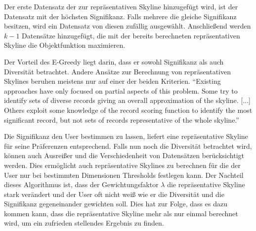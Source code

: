 Der erste Datensatz der zur repräsentativen Skyline hinzugefügt wird, ist der Datensatz mit der höchsten Signifikanz. Falls mehrere die gleiche Signifikanz besitzen, wird ein Datensatz von diesen zufällig ausgewählt.
Anschließend werden $k-1$ Datensätze hinzugefügt, die mit der bereits berechneten repräsentativen Skyline die Objektfunktion maximieren.

Der Vorteil des E-Greedy liegt darin, dass er sowohl Signifikanz als auch Diversität betrachtet. Andere Ansätze zur Berechnung von repräsentativen Skylines beruhen meistens nur auf einer der beiden Kriterien.  
\enquote{Existing approaches have only focused on partial aspects of this problem. Some try to identify sets of diverse records giving an overall approximation of the skyline. [...] Others exploit some knowledge of the record scoring function to identify the most significant record, but not sets of records representative of the whole skyline.} \cite[p. 1]{magnani2014taking}
 
Die Signifikanz den User bestimmen zu lassen, liefert eine repräsentative Skyline für seine Präferenzen entsprechend. Falls nun noch die Diversität betrachtet wird, können auch Ausreißer und die Verschiedenheit von Datensätzen berücksichtigt werden. Dies ermöglicht auch repräsentative Skylines zu berechnen für die der User nur bei bestimmten Dimensionen Thresholds festlegen kann.
Der Nachteil dieses Algorithmus ist, dass der Gewichtungsfaktor $\lambda$ die repräsentative Skyline stark verändert und der User oft nicht weiß wie er die Diversität und die Signifikanz gegeneinander gewichten soll. Dies hat zur Folge, dass es dazu kommen kann, dass die repräsentative Skyline mehr als nur einmal berechnet wird, um ein zufrieden stellendes Ergebnis zu finden.
